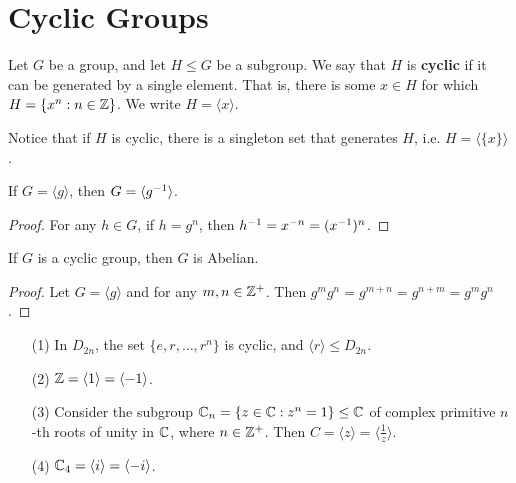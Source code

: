 \section{Cyclic Groups}
\label{section_2.3}

\begin{definition}
  Let $G$ be a group, and let  $H \leq G$ be a subgroup. We say that  $H$ is
  \textbf{cyclic} if it can be generated by a single element. That is, there
  is some $x \in H$ for which  $H=\{x^n : n \in \mathbb{Z}\}$. We write
  $H=\langle x \rangle$.
\end{definition}
\begin{remark}
  Notice that if $H$ is cyclic, there is a singleton set that generates  $H$,
  i.e.  $H=\langle \{x\} \rangle$.
\end{remark}

\begin{proposition}\label{proposition_2.3.1}
  If $G=\langle g \rangle$, then $G=\langle g^{-1} \rangle$.
\end{proposition}
\begin{proof}
  For any $h \in G$, if  $h=g^n$, then $h^{-1}=x^{-n}=(x^{-1})^n$.
\end{proof}

\begin{proposition}\label{proposition_2.3.2}
  If $G$ is a cyclic group, then  $G$ is Abelian.
\end{proposition}
\begin{proof}
  Let $G=\langle g \rangle$ and for any $m,n \in \mathbb{Z}^+$. Then
  $g^mg^n=g^{m+n}=g^{n+m}=g^mg^n$.
\end{proof}

\begin{example}
  \begin{enumerate}
    \item[(1)] In $D_{2n}$, the set $\{e,r, \dots, r^n\}$ is cyclic, and
      $\langle r \rangle \leq D_{2n}$.

    \item[(2)] $\mathbb{Z}= \langle 1 \rangle=\langle -1 \rangle$.

    \item[(3)] Consider the subgroup $\mathbb{C}_n=\{z \in \mathbb{C} : z^n=1\} \leq \mathbb{C}$ of
      complex primitive $n$-th roots of unity in $\mathbb{C}$, where  $n \in
      \mathbb{Z}^+$. Then $C=\langle z \rangle=\langle \frac{1}{z} \rangle$.

    \item[(4)] $\mathbb{C}_4=\langle i \rangle=\langle -i \rangle$.
  \end{enumerate}
\end{example}

